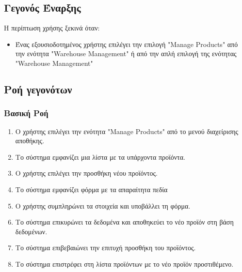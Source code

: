 \documentclass[12pt,a4paper,twoside]{book}
\begin{document}
\subsection{Γεγονός Έναρξης}
Η περίπτωση χρήσης ξεκινά όταν:
\begin{itemize}
  \item Ένας εξουσιοδοτημένος χρήστης επιλέγει την επιλογή "Manage Products" από την ενότητα "Warehouse Management" ή από την απλή επιλογή της ενότητας "Warehouse Management" %
\end{itemize}

\subsection{Ροή γεγονότων}

\subsubsection{Βασική Ροή}
\begin{enumerate}
  \item Ο χρήστης επιλέγει την ενότητα "Manage Products" από το μενού διαχείρισης αποθήκης. %
  \item Το σύστημα εμφανίζει μια λίστα με τα υπάρχοντα προϊόντα.
  \item Ο χρήστης επιλέγει την προσθήκη νέου προϊόντος.
  \item Το σύστημα εμφανίζει φόρμα με τα απαραίτητα πεδία %
  \item Ο χρήστης συμπληρώνει τα στοιχεία και υποβάλλει τη φόρμα.
  \item Το σύστημα επικυρώνει τα δεδομένα και αποθηκεύει το νέο προϊόν στη βάση δεδομένων.
  \item Το σύστημα επιβεβαιώνει την επιτυχή προσθήκη του προϊόντος.
  \item Το σύστημα επιστρέφει στη λίστα προϊόντων με το νέο προϊόν προστιθέμενο.
\end{enumerate}
\end{document}
